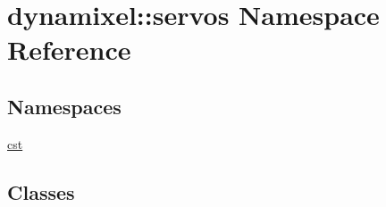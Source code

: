 \hypertarget{namespacedynamixel_1_1servos}{}\section{dynamixel\+:\+:servos Namespace Reference}
\label{namespacedynamixel_1_1servos}
\subsection*{Namespaces}
\begin{DoxyCompactItemize}
\item 
 \hyperlink{namespacedynamixel_1_1servos_1_1cst}{cst}
\end{DoxyCompactItemize}
\subsection*{Classes}
